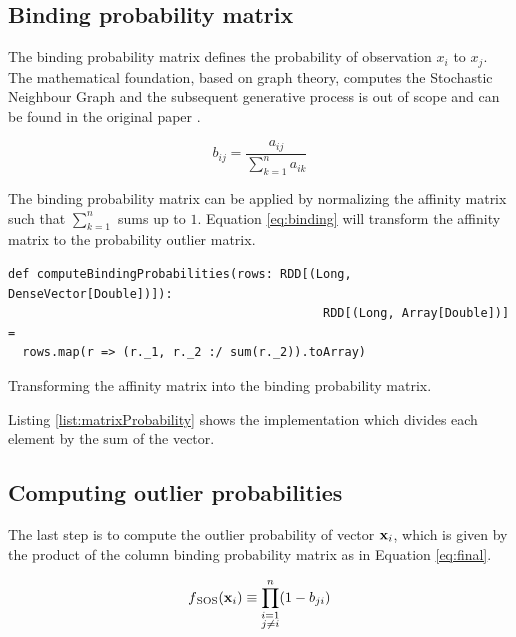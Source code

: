 \subsection{Binding probability matrix \label{subsec:bindingprob}}

The binding probability matrix defines the probability of observation $x_{i}$ to $x_{j}$. The mathematical foundation, based on graph theory, computes the Stochastic Neighbour Graph and the subsequent generative process is out of scope and can be found in the original paper \cite{MSU:CSE:00:2}.

\begin{equation}
b_{ij} = \frac{a_{ij}}{\sum_{k=1}^{n}a_{ik}}
\label{eq:binding}
\end{equation}

The binding probability matrix can be applied by normalizing the affinity matrix such that $\sum_{k=1}^{n}$ sums up to $1$. Equation \ref{eq:binding} will transform the affinity matrix to the probability outlier matrix.

\begin{listing}[ht!]
\begin{verbatim}
def computeBindingProbabilities(rows: RDD[(Long, DenseVector[Double])]): 
                                            RDD[(Long, Array[Double])] = 
  rows.map(r => (r._1, r._2 :/ sum(r._2)).toArray)
\end{verbatim}

\caption{Transforming the affinity matrix into the binding probability matrix.}
\label{list:matrixProbability}
\end{listing}

Listing \ref{list:matrixProbability} shows the implementation which divides each element by the sum of the vector.

\subsection{Computing outlier probabilities \label{subsec:outlierprobabilities}}

The last step is to compute the outlier probability of vector ${\bf x}_{i}$, which is given by the product of the column binding probability matrix as in Equation \ref{eq:final}.

\begin{equation}
f{_\text{SOS}}({\bf x}_{i}) \equiv \prod^{n}_{\substack{i=1\\j \neq i}}(1-b_{ji}) \label{eq:final}
\end{equation}

